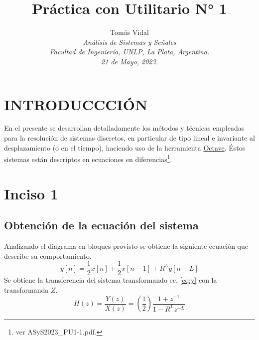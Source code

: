 \documentclass[letterpaper, 10 pt, conference]{ieeeconf}  %
\title{\LARGE \bf Pr\'actica con Utilitario N° 1}
\author{
  Tom\'as Vidal\\
  {\it An\'alisis de Sistemas y Se\~{n}ales}\\
  {\it Facultad de Ingenier\'ia, UNLP, La Plata, Argentina.}\\
  {\it 21 de Mayo, 2023.}
}                                            %
\begin{document}
\maketitle
\thispagestyle{empty}
\pagestyle{empty}

\section{INTRODUCCCI\'ON}
En el presente se desarrollan detalladamente los m\'etodos y t\'ecnicas empleadas para la resoluci\'on de sistemas discretos, en particular de tipo lineal e invariante al desplazamiento (o en el tiempo), haciendo uso de la herramienta \href{https://octave.org/}{Octave}. \'Estos sistemas est\'an descriptos en ecuaciones en diferencias\footnote{ver ASyS2023\_PU1-1.pdf.}.

\section{Inciso 1}

\subsection{Obtenci\'on de la ecuaci\'on del sistema}
Analizando el diagrama en bloques provisto se obtiene la siguiente ecuaci\'on que describe su comportamiento.
\begin{equation} \label{eq:y}
  y[n] = \frac{1}{2}x[n] + \frac{1}{2}x[n-1] + R^{L}y[n-L]
\end{equation}
Se obtiene la transferencia del sistema transformando ec. \ref{eq:y} con la transformanda $Z$.
\begin{equation} \label{eq:Hz}
  H(z) = \frac{Y(z)}{X(z)} = (\frac{1}{2})\frac{1 + z^{-1}}{1 - R^{L}z^{-L}}
\end{equation}
\end{document}
